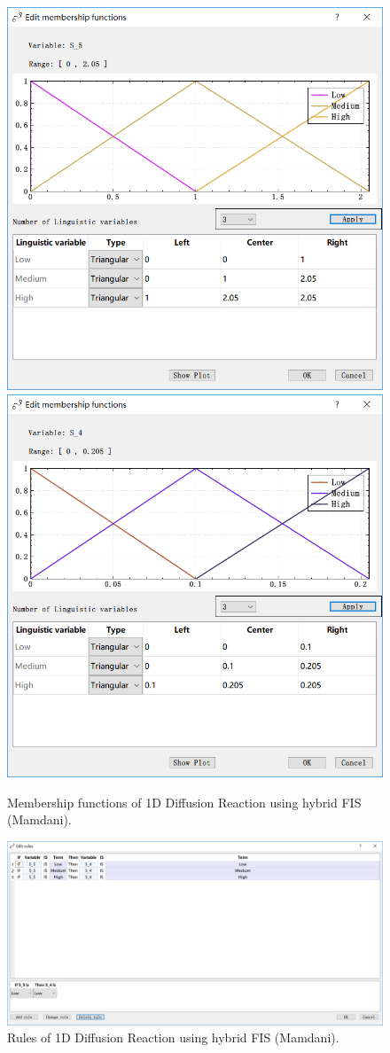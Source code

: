 \documentclass[journal,a4paper,onecolumn]{article}
\begin{document}
\begin{figure}[!hbt]
	\begin{center}
		\includegraphics[width=0.45\columnwidth]{fig36}
		\includegraphics[width=0.45\columnwidth]{fig37}
		\caption{Membership functions of 1D Diffusion Reaction using hybrid FIS (Mamdani).}
		\label{fig:Membership functions of 1D Diffusion Reaction using hybrid FIS (Mamdani).}
	\end{center}
\end{figure}

\begin{figure}[!hbt]
	\begin{center}
		\includegraphics[width=\columnwidth]{fig38}
		\caption{Rules of 1D Diffusion Reaction using hybrid FIS (Mamdani).}
		\label{fig:Rules of 1D Diffusion Reaction using hybrid FIS (Mamdani).}
	\end{center}
\end{figure}
\end{document}
